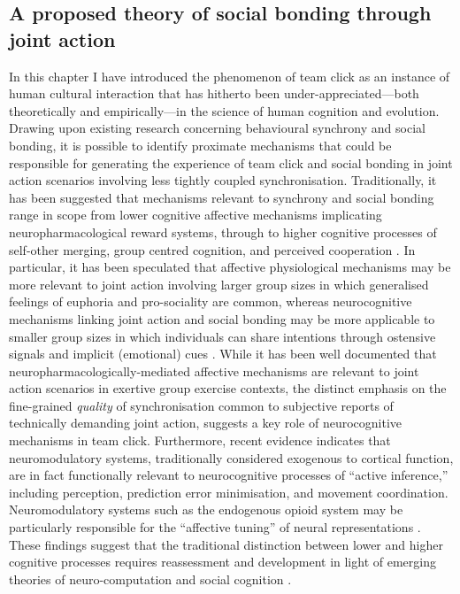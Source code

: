 \begin{CJK}{UTF8}{gbsn}
{\clearpage
\section{A proposed theory of social bonding through joint action}
In this chapter I have introduced the phenomenon of team click as an instance of human cultural interaction that has hitherto been under-appreciated---both theoretically and empirically---in the science of human cognition and evolution.  Drawing upon existing research concerning behavioural synchrony and social bonding, it is possible to identify proximate mechanisms that could be responsible for generating the experience of team click and social bonding in joint action scenarios involving less tightly coupled synchronisation.
Traditionally, it has been suggested that mechanisms relevant to synchrony and social bonding range in scope from lower cognitive affective mechanisms implicating neuropharmacological reward systems, through to higher cognitive processes of self-other merging, group centred cognition, and perceived cooperation \citep{Mogan2017}. In particular, it has been speculated that affective physiological mechanisms may be more relevant to joint action involving larger group sizes in which generalised feelings of euphoria and pro-sociality are common, whereas neurocognitive mechanisms linking joint action and social bonding may be more applicable to smaller group sizes in which individuals can share intentions through ostensive signals and implicit (emotional) cues \citep{Semin2008,Frith2010}.
While it has been well documented that neuropharmacologically-mediated affective mechanisms are relevant to joint action scenarios in exertive group exercise contexts\citep{Cohen2009,Sullivan2013,Tarr2015}, the distinct emphasis on the fine-grained \textit{quality} of synchronisation common to subjective reports of technically demanding joint action, suggests a key role of neurocognitive mechanisms in team click.
Furthermore, recent evidence indicates that neuromodulatory systems, traditionally considered exogenous to cortical function, are in fact functionally relevant to neurocognitive processes of ``active inference,'' including perception, prediction error minimisation, and movement coordination\citep{Pessoa2013,Krahe2013,Buchel2014,Miller2017}.  Neuromodulatory systems such as the endogenous opioid system may be particularly responsible for the ``affective tuning'' of neural representations \citep{Panksepp1998,Pessoa2013}. These findings suggest that the traditional distinction between lower and higher cognitive processes requires reassessment and development in light of emerging theories of neuro-computation and social cognition \citep{Pessoa2013,Clark2013}.

}
\end{CJK}
